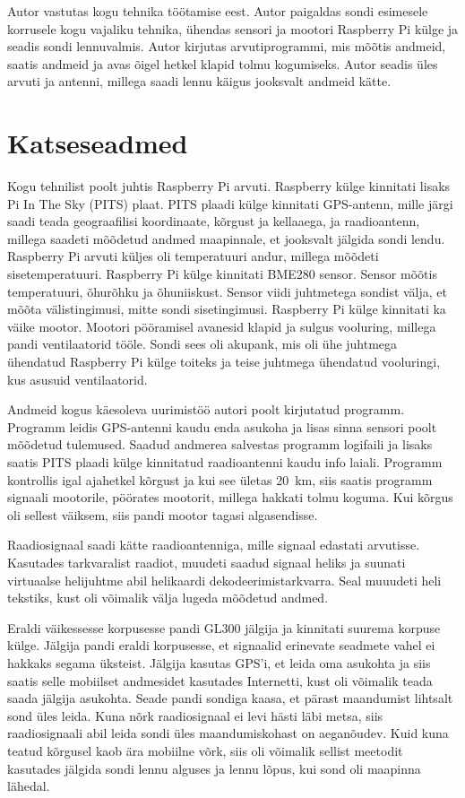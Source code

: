 \documentclass{trkut}%
\begin{document}
Autor vastutas kogu tehnika töötamise eest. Autor paigaldas sondi esimesele korrusele kogu vajaliku tehnika, ühendas sensori ja mootori Raspberry Pi külge ja seadis sondi lennuvalmis. Autor kirjutas arvutiprogrammi, mis mõõtis andmeid, saatis andmeid ja avas õigel hetkel klapid tolmu kogumiseks. Autor seadis üles arvuti ja antenni, millega saadi lennu käigus jooksvalt andmeid kätte.

\section{Katseseadmed}
Kogu tehnilist poolt juhtis Raspberry Pi arvuti. Raspberry külge kinnitati lisaks Pi In The Sky (PITS) plaat. PITS plaadi külge kinnitati GPS-antenn, mille järgi saadi teada geograafilisi koordinaate, kõrgust ja kellaaega, ja raadioantenn, millega saadeti mõõdetud andmed maapinnale, et jooksvalt jälgida sondi lendu. Raspberry Pi arvuti küljes oli temperatuuri andur, millega mõõdeti sisetemperatuuri. Raspberry Pi külge kinnitati BME280 sensor. Sensor mõõtis temperatuuri, õhurõhku ja õhuniiskust. Sensor viidi juhtmetega sondist välja, et mõõta välistingimusi, mitte sondi sisetingimusi. Raspberry Pi külge kinnitati ka väike mootor. Mootori pööramisel avanesid klapid ja sulgus vooluring, millega pandi ventilaatorid tööle. Sondi sees oli akupank, mis oli ühe juhtmega ühendatud Raspberry Pi külge toiteks ja teise juhtmega ühendatud vooluringi, kus asusuid ventilaatorid.

Andmeid kogus käesoleva uurimistöö autori poolt kirjutatud programm. Programm leidis GPS-antenni kaudu enda asukoha ja lisas sinna sensori poolt mõõdetud tulemused. Saadud andmerea salvestas programm logifaili ja lisaks saatis PITS plaadi külge kinnitatud raadioantenni kaudu info laiali. Programm kontrollis igal ajahetkel kõrgust ja kui see ületas \SI{20}{km}, siis saatis programm signaali mootorile, pöörates mootorit, millega hakkati tolmu koguma. Kui kõrgus oli sellest väiksem, siis pandi mootor tagasi algasendisse.

Raadiosignaal saadi kätte raadioantenniga, mille signaal edastati arvutisse. Kasutades tarkvaralist raadiot, muudeti saadud signaal heliks ja suunati virtuaalse helijuhtme abil helikaardi dekodeerimistarkvarra. Seal muuudeti heli tekstiks, kust oli võimalik välja lugeda mõõdetud andmed.

Eraldi väikessesse korpusesse pandi GL300 jälgija ja kinnitati suurema korpuse külge. Jälgija pandi eraldi korpusesse, et signaalid erinevate seadmete vahel ei hakkaks segama üksteist. Jälgija kasutas GPS'i, et leida oma asukohta ja siis saatis selle mobiilset andmesidet kasutades Internetti, kust oli võimalik teada saada jälgija asukohta. Seade pandi sondiga kaasa, et pärast maandumist lihtsalt sond üles leida. Kuna nõrk raadiosignaal ei levi hästi läbi metsa, siis raadiosignaali abil leida sondi üles maandumiskohast on aeganõudev. Kuid kuna teatud kõrgusel kaob ära mobiilne võrk, siis oli võimalik sellist meetodit kasutades jälgida sondi lennu alguses ja lennu lõpus, kui sond oli maapinna lähedal.
\end{document}
